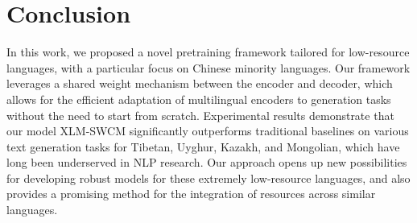 \section{Conclusion}\label{sec:conclusion}
In this work, we proposed a novel pretraining framework tailored for low-resource languages, with a particular focus on Chinese minority languages. Our framework leverages a shared weight mechanism between the encoder and decoder, which allows for the efficient adaptation of multilingual encoders to generation tasks without the need to start from scratch. Experimental results demonstrate that our model XLM-SWCM significantly outperforms traditional baselines on various text generation tasks for Tibetan, Uyghur, Kazakh, and Mongolian, which have long been underserved in NLP research. Our approach opens up new possibilities for developing robust models for these extremely low-resource languages, and also provides a promising method for the integration of resources across similar languages.

